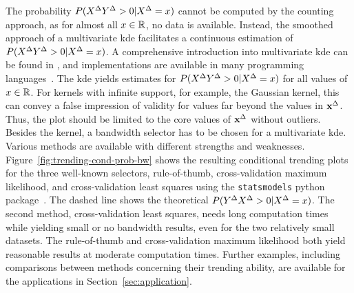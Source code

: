 The probability $P(X^{\Delta} Y^{\Delta} > 0 | X^{\Delta} = x)$ cannot be computed by the counting approach, as for almost all $x \in \mathbb{R}$, no data is available.
Instead, the smoothed approach of a multivariate \acf{kde} facilitates a continuous estimation of $P(X^{\Delta} Y^{\Delta} > 0 | X^{\Delta} = x)$.
A comprehensive introduction into multivariate \ac{kde} can be found in \textcite{Gramacki2018}, and implementations are available in many programming languages~\parencite[e.g., for  Python in][]{Seabold2010}.
The \ac{kde} yields estimates for $P(X^{\Delta} Y^{\Delta} > 0 | X^{\Delta} = x)$ for all values of $x \in \mathbb{R}$.
For kernels with infinite support, for example, the Gaussian kernel, this can convey a false impression of validity for values far beyond the values in $\mathbf{x}^{\Delta}$.
Thus, the plot should be limited to the core values of $\mathbf{x}^{\Delta}$ without outliers.
Besides the kernel, a bandwidth selector has to be chosen for a multivariate \ac{kde}.
Various methods are available with different strengths and weaknesses.
Figure~\ref{fig:trending-cond-prob-bw} shows the resulting conditional trending plots for the three well-known selectors, rule-of-thumb, cross-validation maximum likelihood, and cross-validation least squares using the \verb|statsmodels| python package~\parencite{Seabold2010}.
The dashed line shows the theoretical $P(Y^{\Delta} X^{\Delta} > 0 | X^{\Delta} = x)$.
The second method, cross-validation least squares, needs long computation times while yielding small or no bandwidth results, even for the two relatively small datasets.
The rule-of-thumb and cross-validation maximum likelihood both yield reasonable results at moderate computation times. 
Further examples, including comparisons between methods concerning their trending ability, are available for the applications in Section~\ref{sec:application}.

